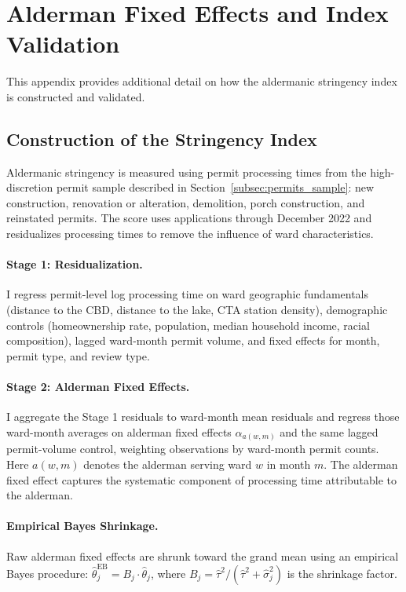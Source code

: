 \section{Alderman Fixed Effects and Index Validation}
\label{sec:appendix_alderman_fe}

This appendix provides additional detail on how the aldermanic stringency index is constructed and validated.

\subsection{Construction of the Stringency Index}

Aldermanic stringency is measured using permit processing times from the high-discretion permit sample described in Section~\ref{subsec:permits_sample}: new construction, renovation or alteration, demolition, porch construction, and reinstated permits.
The score uses applications through December 2022 and residualizes processing times to remove the influence of ward characteristics.

\paragraph{Stage 1: Residualization.}
I regress permit-level log processing time on ward geographic fundamentals (distance to the CBD, distance to the lake, CTA station density), demographic controls (homeownership rate, population, median household income, racial composition), lagged ward-month permit volume, and fixed effects for month, permit type, and review type.

\paragraph{Stage 2: Alderman Fixed Effects.}
I aggregate the Stage 1 residuals to ward-month mean residuals and regress those ward-month averages on alderman fixed effects $\alpha_{a(w,m)}$ and the same lagged permit-volume control, weighting observations by ward-month permit counts.
Here $a(w,m)$ denotes the alderman serving ward $w$ in month $m$.
The alderman fixed effect captures the systematic component of processing time attributable to the alderman.

\paragraph{Empirical Bayes Shrinkage.}
Raw alderman fixed effects are shrunk toward the grand mean using an empirical Bayes procedure: $\hat{\theta}_j^{\text{EB}} = B_j \cdot \hat{\theta}_j$, where $B_j = \hat{\tau}^2/(\hat{\tau}^2 + \hat{\sigma}_j^2)$ is the shrinkage factor.

